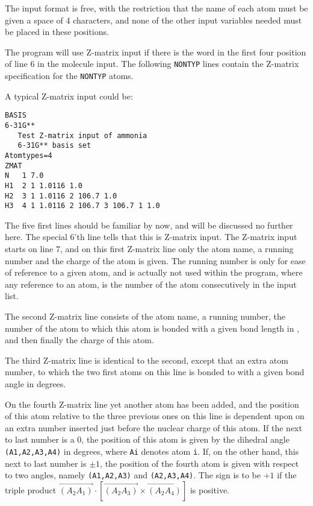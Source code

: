 The input format is free, with
the restriction that the name of each atom must be given a space
of 4 characters, and none of the other input variables needed must be
placed in these positions.

The program will use Z-matrix input if there is
the word  
in the first four position of line 6 in the molecule input.
The following {\tt NONTYP} lines contain the Z-matrix specification
for the {\tt NONTYP} atoms.

A typical Z-matrix input could be:
\begin{verbatim}
BASIS
6-31G**
   Test Z-matrix input of ammonia
   6-31G** basis set
Atomtypes=4
ZMAT
N   1 7.0
H1  2 1 1.0116 1.0
H2  3 1 1.0116 2 106.7 1.0
H3  4 1 1.0116 2 106.7 3 106.7 1 1.0
\end{verbatim}
The five first lines should be familiar by now, and will be discussed
no further here. 
The special 6'th line tells that this is Z-matrix input.
The Z-matrix input starts on line 7, and on this first Z-matrix
line only the atom name, a running number and the charge of the
atom
is given. The running number is only for
ease of reference to a given atom, and is actually not used within the
program, where any reference to an atom, is the number of the
atom consecutively in the input list.

The second Z-matrix line consists of the atom name, a running number,
the number of the atom to which this atom is bonded with a given bond
length in \angstrom{}, and then finally the charge of this atom.

The third Z-matrix line is identical to the second, except that an extra atom
number, to which the two first atoms on this line is bonded to with a
given bond angle in degrees.

On the fourth Z-matrix line yet another atom has been added, and the position
of this atom relative to the three previous ones on this line is
dependent upon on an extra number inserted just before the nuclear
charge of this atom. If the next to last number is a 0, the
position of this atom is given by the dihedral angle {\tt
(A1,A2,A3,A4)} in degrees, where {\tt Ai} denotes atom {\tt i}. If, on the other
hand, this next to last number is $\pm 1$, the position of the fourth
atom is given with respect to two angles, namely {\tt (A1,A2,A3)} and
{\tt (A2,A3,A4)}. The sign is to be $+ 1$ if the triple product
$\overrightarrow{\left(A_{2}A_{1}\right)}\cdot\left[\overrightarrow{\left(A_{2}A_{3}\right)}\times\overrightarrow{\left(A_{2}A_{4}\right)}\right]$
is positive.

